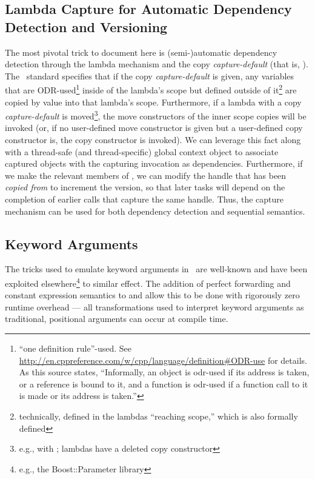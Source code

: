 \subsection{Lambda Capture for Automatic Dependency Detection and Versioning}

The most pivotal trick to document here is (semi-)automatic dependency detection
through the  lambda mechanism and the copy {\it capture-default} (that is,
\inlinecode{[=]}).  The \CC\ standard specifies that if the copy
{\it capture-default} is given, any variables that are ODR-used\footnote{``one
definition rule''-used.  See
\url{http://en.cppreference.com/w/cpp/language/definition\#ODR-use} for
details.
As this source states, ``Informally, an object is odr-used if its address is
taken, or a reference is bound to it, and a function is odr-used if a function
call to it is made or its address is taken.''}
inside of the lambda's scope but
defined outside of it\footnote{technically, defined in the lambdas
``reaching scope,'' which is also formally defined} are copied by value into
that lambda's scope.  Furthermore, if a lambda with a copy {\it capture-default}
is moved\footnote{e.g., with ; lambdas have a deleted
copy constructor}, the move constructors of the inner scope copies will be
invoked (or, if no user-defined move constructor is given but a user-defined
copy constructor is, the copy constructor is invoked).  We can leverage this
fact along with a thread-safe (and thread-specific) global context object to
associate captured  objects with the capturing
 invocation as dependencies.  Furthermore, if we
make the relevant members of  ,
we can modify the handle that has been {\it copied from} to increment the
version, so that later tasks will depend on the completion of earlier
 calls that capture the same handle.  Thus, the capture
mechanism can be used for both dependency detection and sequential semantics.

\subsection{Keyword Arguments}
\label{sec:kwargs}

The tricks used to emulate keyword arguments in \CC\ are well-known and have been
exploited elsewhere\footnote{e.g., the Boost::Parameter library} to similar
effect.  The addition of perfect forwarding and constant expression semantics to
 and  allow this to be done with rigorously zero runtime overhead ---
all transformations used to interpret keyword arguments as traditional,
positional arguments can occur at compile time.
